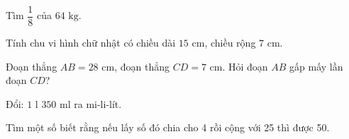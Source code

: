 \begin{ex} %
Tìm $\dfrac{1}{8}$ của $64\text{ kg}$.
\end{ex}

\begin{ex} %
Tính chu vi hình chữ nhật có chiều dài $15\text{ cm}$, chiều rộng $7\text{ cm}$.
\end{ex}

\begin{ex} %
Đoạn thẳng $AB = 28\text{ cm}$, đoạn thẳng $CD = 7\text{ cm}$. Hỏi đoạn $AB$ gấp mấy lần đoạn $CD$?
\end{ex}

\begin{ex} %
Đổi: $1\text{ l } 350\text{ ml}$ ra mi-li-lít.
\end{ex}

\begin{ex} %
Tìm một số biết rằng nếu lấy số đó chia cho 4 rồi cộng với 25 thì được 50.
\end{ex}
